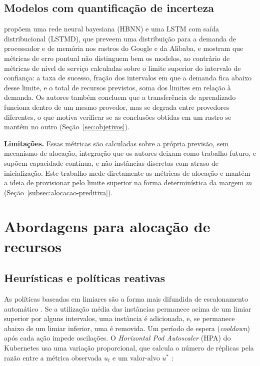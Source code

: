 \subsection{Modelos com quantificação de incerteza}
\label{subsec:incerteza}

 propõem uma rede neural bayesiana (HBNN) e uma LSTM com saída distribucional (LSTMD), que preveem uma distribuição para a demanda de processador e de memória nos rastros do Google e da Alibaba, e mostram que métricas de erro pontual não distinguem bem os modelos, ao contrário de métricas de nível de serviço calculadas sobre o limite superior do intervalo de confiança: a taxa de sucesso, fração dos intervalos em que a demanda fica abaixo desse limite, e o total de recursos previstos, soma dos limites em relação à demanda. Os autores também concluem que a transferência de aprendizado funciona dentro de um mesmo provedor, mas se degrada entre provedores diferentes, o que motiva verificar se as conclusões obtidas em um rastro se mantêm no outro (Seção~\ref{sec:objetivos}).

\textbf{Limitações.} Essas métricas são calculadas sobre a própria previsão, sem mecanismo de alocação, integração que os autores deixam como trabalho futuro, e supõem capacidade contínua, e não instâncias discretas com atraso de inicialização. Este trabalho mede diretamente as métricas de alocação e mantém a ideia de provisionar pelo limite superior na forma determinística da margem $m$ (Seção~\ref{subsec:alocacao-preditiva}).

\section{Abordagens para alocação de recursos}
\label{sec:alocacao}

\subsection{Heurísticas e políticas reativas}
\label{subsec:heuristicas}

As políticas baseadas em limiares são a forma mais difundida de escalonamento automático \cite{lorido2014autoscaling}. Se a utilização média das instâncias permanece acima de um limiar superior por alguns intervalos, uma instância é adicionada, e, se permanece abaixo de um limiar inferior, uma é removida. Um período de espera (\textit{cooldown}) após cada ação impede oscilações. O \textit{Horizontal Pod Autoscaler} (HPA) do Kubernetes usa uma variação proporcional, que calcula o número de réplicas pela razão entre a métrica observada $u_t$ e um valor-alvo $u^{*}$ \cite{kubernetes2024hpa}:

